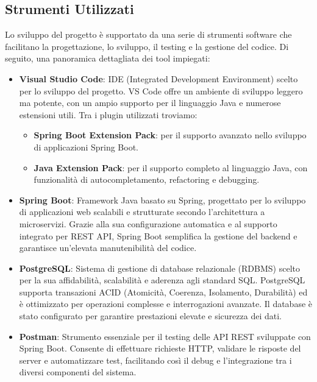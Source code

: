 \subsection{Strumenti Utilizzati}

Lo sviluppo del progetto è supportato da una serie di strumenti software che facilitano la progettazione, lo sviluppo, il testing e la gestione del codice. Di seguito, una panoramica dettagliata dei tool impiegati:

\begin{itemize}
    \item \textbf{Visual Studio Code}: IDE (Integrated Development Environment) scelto per lo sviluppo del progetto. VS Code offre un ambiente di sviluppo leggero ma potente, con un ampio supporto per il linguaggio Java e numerose estensioni utili. Tra i plugin utilizzati troviamo:
    \begin{itemize}
        \item \textbf{Spring Boot Extension Pack}: per il supporto avanzato nello sviluppo di applicazioni Spring Boot.
        \item \textbf{Java Extension Pack}: per il supporto completo al linguaggio Java, con funzionalità di autocompletamento, refactoring e debugging.
    \end{itemize}
    
    \item \textbf{Spring Boot}: Framework Java basato su Spring, progettato per lo sviluppo di applicazioni web scalabili e strutturate secondo l’architettura a microservizi. Grazie alla sua configurazione automatica e al supporto integrato per REST API, Spring Boot semplifica la gestione del backend e garantisce un’elevata manutenibilità del codice.
    
    \item \textbf{PostgreSQL}: Sistema di gestione di database relazionale (RDBMS) scelto per la sua affidabilità, scalabilità e aderenza agli standard SQL. PostgreSQL supporta transazioni ACID (Atomicità, Coerenza, Isolamento, Durabilità) ed è ottimizzato per operazioni complesse e interrogazioni avanzate. Il database è stato configurato per garantire prestazioni elevate e sicurezza dei dati.

    \item \textbf{Postman}: Strumento essenziale per il testing delle API REST sviluppate con Spring Boot. Consente di effettuare richieste HTTP, validare le risposte del server e automatizzare test, facilitando così il debug e l’integrazione tra i diversi componenti del sistema.


\end{itemize}
